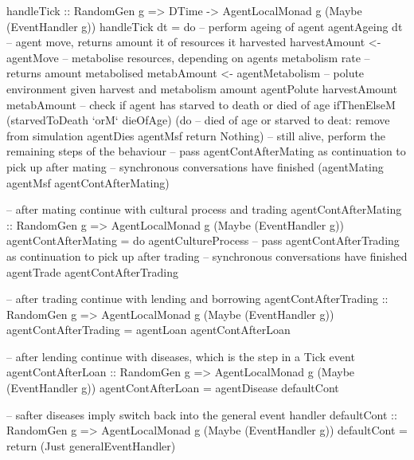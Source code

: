 \begin{HaskellCode}
handleTick :: RandomGen g => DTime -> AgentLocalMonad g (Maybe (EventHandler g))
handleTick dt = do
  -- perform ageing of agent
  agentAgeing dt
  -- agent move, returns amount it of resources it harvested
  harvestAmount <- agentMove
  -- metabolise resources, depending on agents metabolism rate
  -- returns amount metabolised
  metabAmount <- agentMetabolism
  -- polute environment given harvest and metabolism amount
  agentPolute harvestAmount metabAmount
  -- check if agent has starved to death or died of age
  ifThenElseM
    (starvedToDeath `orM` dieOfAge)
    (do
      -- died of age or starved to deat: remove from simulation
      agentDies agentMsf
      return Nothing) 
    -- still alive, perform the remaining steps of the behaviour
    -- pass agentContAfterMating as continuation to pick up after mating
    -- synchronous conversations have finished
    (agentMating agentMsf agentContAfterMating)

-- after mating continue with cultural process and trading
agentContAfterMating :: RandomGen g 
                     => AgentLocalMonad g (Maybe (EventHandler g))
agentContAfterMating = do
    agentCultureProcess
    -- pass agentContAfterTrading as continuation to pick up after trading 
    -- synchronous conversations have finished
    agentTrade agentContAfterTrading 

-- after trading continue with lending and borrowing
agentContAfterTrading :: RandomGen g 
                      => AgentLocalMonad g (Maybe (EventHandler g))
agentContAfterTrading = agentLoan agentContAfterLoan

-- after lending continue with diseases, which is the step in a Tick event
agentContAfterLoan :: RandomGen g 
                   => AgentLocalMonad g (Maybe (EventHandler g))
agentContAfterLoan = agentDisease defaultCont

-- safter diseases imply switch back into the general event handler
defaultCont :: RandomGen g => AgentLocalMonad g (Maybe (EventHandler g))
defaultCont = return (Just generalEventHandler)
\end{HaskellCode}

